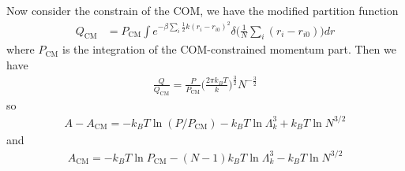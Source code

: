 \documentclass[aps,pre,a4paper,showkeys,fleqn]{revtex4}
\newcommand{\com}[0]{{\textrm{CM}}}
\begin{document}
Now consider the constrain of the COM, we have the modified partition function
\begin{align*}
  Q_\com
  &= 
    {P_\com}
    \int e^{-\beta\sum_i \frac 12k(r_i - r_{i0})^2} \delta\big(\frac1N\sum_i (r_i -  r_{i0})\big) dr 
\end{align*}
where $P_\com$ is the integration of the COM-constrained momentum part.
Then we have
\begin{align}
  \frac{Q}{Q_\com} = \frac{P}{P_\com}\Big( \frac{2\pi k_BT}k  \Big)^{\frac32} N^{-\frac32}
\end{align}
so
\begin{align}
  A - A_\com = -k_BT \ln(P/P_\com) - k_BT \ln \Lambda_k^3 + k_BT \ln N^{3/2} 
\end{align}
and
\begin{align}
  A_\com = -k_BT \ln P_\com - (N-1) k_BT \ln \Lambda_k^3 - k_BT \ln N^{3/2}
\end{align}
\end{document}
